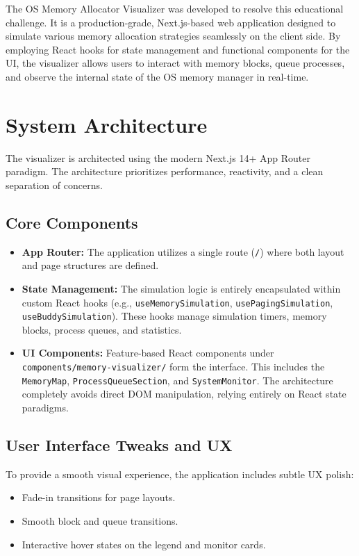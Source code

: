 \documentclass[conference]{IEEEtran}
\begin{document}
The OS Memory Allocator Visualizer was developed to resolve this educational challenge. It is a production-grade, Next.js-based web application designed to simulate various memory allocation strategies seamlessly on the client side. By employing React hooks for state management and functional components for the UI, the visualizer allows users to interact with memory blocks, queue processes, and observe the internal state of the OS memory manager in real-time.

\section{System Architecture}
The visualizer is architected using the modern Next.js 14+ App Router paradigm. The architecture prioritizes performance, reactivity, and a clean separation of concerns.

\subsection{Core Components}
\begin{itemize}
    \item \textbf{App Router:} The application utilizes a single route (\texttt{/}) where both layout and page structures are defined.
    \item \textbf{State Management:} The simulation logic is entirely encapsulated within custom React hooks (e.g., \texttt{useMemorySimulation}, \texttt{usePagingSimulation}, \texttt{useBuddySimulation}). These hooks manage simulation timers, memory blocks, process queues, and statistics.
    \item \textbf{UI Components:} Feature-based React components under \texttt{components/memory-visualizer/} form the interface. This includes the \texttt{MemoryMap}, \texttt{ProcessQueueSection}, and \texttt{SystemMonitor}. The architecture completely avoids direct DOM manipulation, relying entirely on React state paradigms.
\end{itemize}

\subsection{User Interface Tweaks and UX}
To provide a smooth visual experience, the application includes subtle UX polish:
\begin{itemize}
    \item Fade-in transitions for page layouts.
    \item Smooth block and queue transitions.
    \item Interactive hover states on the legend and monitor cards.
\end{itemize}
\end{document}

